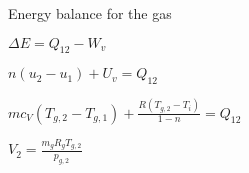 Energy balance for the gas  

\( \Delta E = Q_{12} - W_v \)  

\( n(u_2 - u_1) + U_v = Q_{12} \)  

\( m c_V (T_{g,2} - T_{g,1}) + \frac{R(T_{g,2} - T_i)}{1 - n} = Q_{12} \)  

\( V_2 = \frac{m_g R_g T_{g,2}}{p_{g,2}} \)